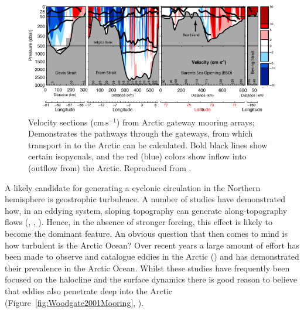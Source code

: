 \documentclass[12pt,a4paper]{report}
\newcommand*\figref[1]{Figure~\ref{#1}}
\begin{document}
\begin{figure}
	\centering
	\includegraphics[width=\linewidth]{Tsubouchi2012Transport}
	\caption[Adapted from \cite{tsubouchi2012arctic}]{Velocity
		sections ($\mathrm{cm}\, \mathrm{s}^{-1}$) from Arctic gateway mooring arrays;
		Demonstrates the pathways through the gateways, from which transport 
		in to the Arctic can be calculated.
		Bold black lines show certain isopycnals, and the red (blue) colors show inflow
		into (outflow from) the Arctic. Reproduced from \cite{tsubouchi2012arctic}.}
	\label{fig:Tsubouchi2012Transport}
\end{figure}

A likely candidate for generating a cyclonic circulation in the Northern hemisphere is
geostrophic turbulence. A number of studies have demonstrated how, in an eddying system, 
sloping topography can generate along-topography flows (\cite{treguier1989topographically}, \cite{adcock2000interactions}, \cite{nost2008asymmetry}). Hence, in the absence of stronger
forcing, this effect is likely to become the dominant feature. An obvious question that then
comes to mind is how turbulent is the Arctic Ocean? Over recent years a large amount  of 
effort has been made to observe and catalogue eddies in the Arctic
(\cite{zhao2014characterizing}) and has demonstrated their prevalence in the Arctic Ocean.
Whilst these studies have frequently been focused on the halocline and the surface dynamics
there is good reason to believe that eddies also penetrate deep into the Arctic 
(\figref{fig:Woodgate2001Mooring}, \cite{woodgate2001arctic}).
\end{document}
